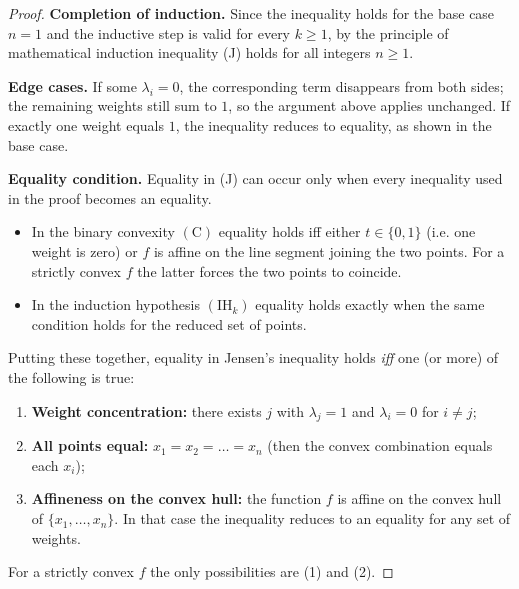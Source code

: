 \begin{proof}
\textbf{Completion of induction.}  
Since the inequality holds for the base case \(n=1\) and the inductive step is valid
for every \(k\ge 1\), by the principle of mathematical induction inequality (J) holds
for all integers \(n\ge 1\).

\textbf{Edge cases.}  
If some \(\lambda_{i}=0\), the corresponding term disappears from both sides; the
remaining weights still sum to \(1\), so the argument above applies unchanged.
If exactly one weight equals \(1\), the inequality reduces to equality, as shown in
the base case.

\textbf{Equality condition.}  
Equality in (J) can occur only when every inequality used in the proof becomes an
equality.

\begin{itemize}
\item In the binary convexity \((\text{C})\) equality holds iff either \(t\in\{0,1\}\) (i.e. one
weight is zero) or \(f\) is affine on the line segment joining the two points. For a
strictly convex \(f\) the latter forces the two points to coincide.
\item In the induction hypothesis \((\text{IH}_k)\) equality holds exactly when the same
condition holds for the reduced set of points.
\end{itemize}
Putting these together, equality in Jensen’s inequality holds \emph{iff} one (or more)
of the following is true:

\begin{enumerate}
\item \textbf{Weight concentration:} there exists \(j\) with \(\lambda_{j}=1\) and
\(\lambda_{i}=0\) for \(i\neq j\);
\item \textbf{All points equal:} \(x_{1}=x_{2}= \dots =x_{n}\) (then the convex
combination equals each \(x_{i}\));
\item \textbf{Affineness on the convex hull:} the function \(f\) is affine on the
convex hull of \(\{x_{1},\dots ,x_{n}\}\). In that case the inequality reduces to an
equality for any set of weights.
\end{enumerate}
For a strictly convex \(f\) the only possibilities are (1) and (2).

\end{proof}